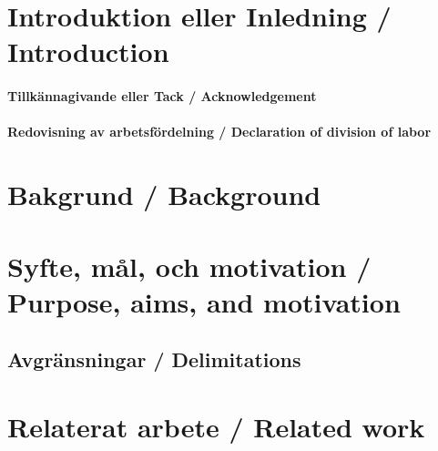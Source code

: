 \documentclass[a4paper,12pt]{article}
\begin{document}
\tableofcontents


\cleardoublepage


\newpage

\mainmatter


\section{Introduktion eller Inledning / Introduction}
\label{sec:introduktion}


\paragraph{Tillkännagivande eller Tack / Acknowledgement}


\paragraph{Redovisning av arbetsfördelning / Declaration of division of labor}



\section{Bakgrund / Background}
\label{sec:bakgrund}


\section{Syfte, mål, och motivation / Purpose, aims, and motivation}\label{sec:syfte}


\subsection{Avgränsningar / Delimitations}


\section{Relaterat arbete / Related work}

\end{document}
